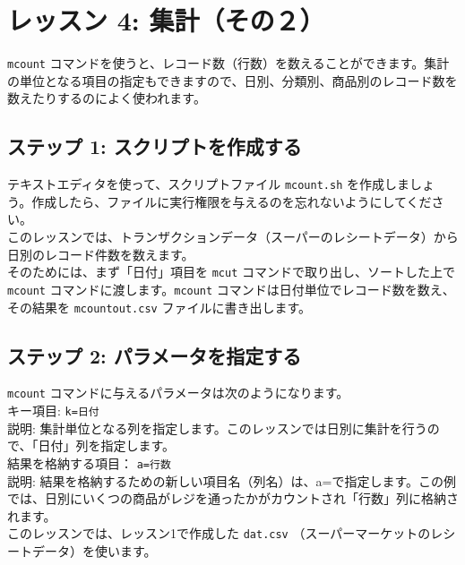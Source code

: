 

%

\section{レッスン 4: 集計（その２）}

\verb|mcount| コマンドを使うと、レコード数（行数）を数えることができます。集計の単位となる項目の指定もできますので、日別、分類別、商品別のレコード数を数えたりするのによく使われます。

\subsection{ステップ 1: スクリプトを作成する}

テキストエディタを使って、スクリプトファイル \verb|mcount.sh| を作成しましょう。作成したら、ファイルに実行権限を与えるのを忘れないようにしてください。\\

このレッスンでは、トランザクションデータ（スーパーのレシートデータ）から日別のレコード件数を数えます。\\

そのためには、まず「日付」項目を \verb|mcut| コマンドで取り出し、ソートした上で \verb|mcount| コマンドに渡します。\verb|mcount| コマンドは日付単位でレコード数を数え、その結果を \verb|mcountout.csv| ファイルに書き出します。

 \subsection{ステップ 2: パラメータを指定する}

{\setlength{\parindent}{0cm}

\verb|mcount| コマンドに与えるパラメータは次のようになります。\\

キー項目: 		\verb|k=日付| \\
説明: 集計単位となる列を指定します。このレッスンでは日別に集計を行うので、「日付」列を指定します。\\

結果を格納する項目： \verb|a=行数| \\
説明: 結果を格納するための新しい項目名（列名）は、a=で指定します。この例では、日別にいくつの商品がレジを通ったかがカウントされ「行数」列に格納されます。\\

このレッスンでは、レッスン1で作成した \verb|dat.csv| （スーパーマーケットのレシートデータ）を使います。
}

